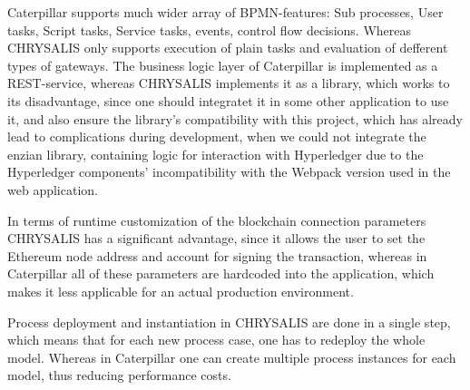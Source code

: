 Caterpillar supports much wider array of BPMN-features: Sub processes, User tasks, Script tasks, Service tasks, events, control flow decisions. Whereas CHRYSALIS only supports execution of plain tasks and evaluation of defferent types of gateways. The business logic layer of Caterpillar is implemented as a REST-service, whereas CHRYSALIS implements it as a library, which works to its disadvantage, since one should integratet it in some other application to use it, and also ensure the library's compatibility with this project, which has already lead to complications during development, when we could not integrate the enzian library, containing logic for interaction with Hyperledger due to the Hyperledger components' incompatibility with the Webpack version used in the web application.

In terms of runtime customization of the blockchain connection parameters CHRYSALIS has a significant advantage, since it allows the user to set the Ethereum node address and account for signing the transaction, whereas in Caterpillar all of these parameters are hardcoded into the application, which makes it less applicable for an actual production environment.

Process deployment and instantiation in CHRYSALIS are done in a single step, which means that for each new process case, one has to redeploy the whole model. Whereas in Caterpillar one can create multiple process instances for each model, thus reducing performance costs.

